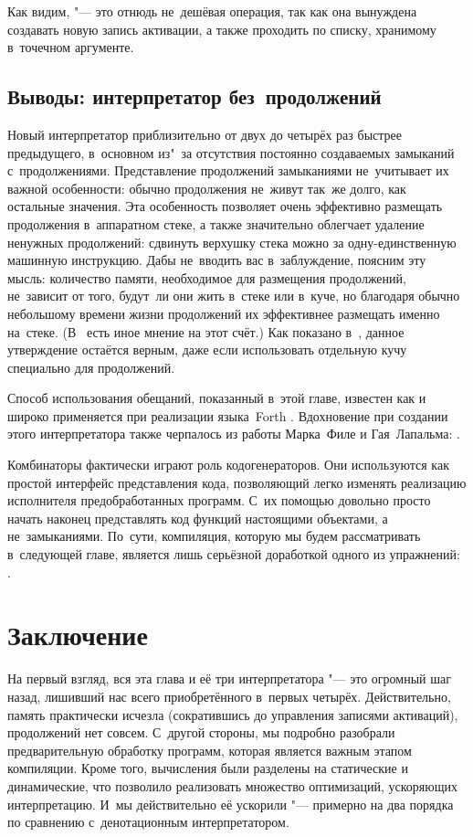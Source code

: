 Как видим,  "--- это отнюдь не~дешёвая операция, так как она вынуждена
создавать новую запись активации, а также проходить по списку, хранимому
в~точечном аргументе.


\subsection{Выводы: интерпретатор без~продолжений}%
\label{fast/dilute/ssect:conclusions}

Новый интерпретатор приблизительно от двух до четырёх раз быстрее предыдущего,
в~основном из"~за отсутствия постоянно создаваемых замыканий с~продолжениями.
Представление продолжений замыканиями не~учитывает их важной особенности: обычно
продолжения не~живут так~же долго, как остальные значения. Эта особенность
позволяет очень эффективно размещать продолжения в~аппаратном стеке, а также
значительно облегчает удаление ненужных продолжений: сдвинуть верхушку стека
можно за одну-единственную машинную инструкцию. Дабы не~вводить вас
в~заблуждение, поясним эту мысль: количество памяти, необходимое для размещения
продолжений, не~зависит от того, будут~ли они жить в~стеке или в~куче, но
благодаря обычно небольшому времени жизни продолжений их эффективнее размещать
именно на~стеке. (В~\cite{app87} есть иное мнение на этот счёт.) Как показано
в~\cite{mb93}, данное утверждение остаётся верным, даже если использовать
отдельную кучу специально для продолжений.

Способ использования обещаний, показанный в~этой главе, известен как  \cite{bel73} и широко применяется при реализации языка~Forth \cite{hon93}.
Вдохновение при создании этого интерпретатора также черпалось из работы
Марка~Филе и Гая~Лапальма: \cite{fl87}.

Комбинаторы фактически играют роль кодогенераторов. Они используются как простой
интерфейс представления кода, позволяющий легко изменять реализацию исполнителя
предобработанных программ. С~их помощью довольно просто начать наконец
представлять код функций настоящими объектами, а не~замыканиями. По~сути,
компиляция, которую мы будем рассматривать в~следующей главе, является лишь
серьёзной доработкой одного из упражнений: .


\section{Заключение}\label{fast/sect:conclusions}

На первый взгляд, вся эта глава и её три интерпретатора "--- это огромный шаг
назад, лишивший нас всего приобретённого в~первых четырёх. Действительно, память
практически исчезла (сократившись до управления записями активаций), продолжений
нет совсем. С~другой стороны, мы подробно разобрали предварительную обработку
программ, которая является важным этапом компиляции. Кроме того, вычисления были
разделены на статические и динамические, что позволило реализовать множество
оптимизаций, ускоряющих интерпретацию. И~мы действительно её ускорили "---
примерно на два порядка по сравнению с~денотационным интерпретатором.

